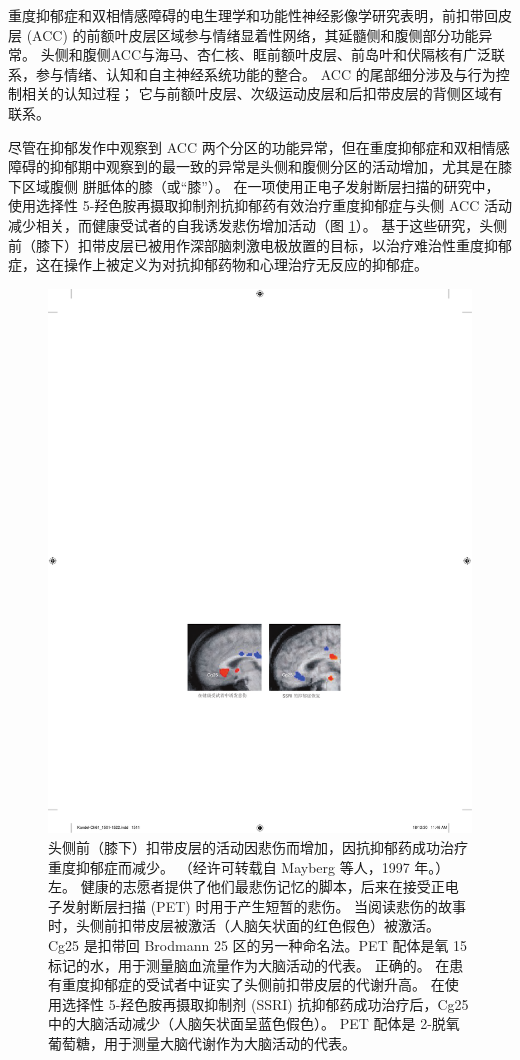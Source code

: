 重度抑郁症和双相情感障碍的电生理学和功能性神经影像学研究表明，前扣带回皮层 (ACC) 的前额叶皮层区域参与情绪显着性网络，其延髓侧和腹侧部分功能异常。 头侧和腹侧ACC与海马、杏仁核、眶前额叶皮层、前岛叶和伏隔核有广泛联系，参与情绪、认知和自主神经系统功能的整合。
ACC 的尾部细分涉及与行为控制相关的认知过程；
它与前额叶皮层、次级运动皮层和后扣带皮层的背侧区域有联系。


尽管在抑郁发作中观察到 ACC 两个分区的功能异常，但在重度抑郁症和双相情感障碍的抑郁期中观察到的最一致的异常是头侧和腹侧分区的活动增加，尤其是在膝下区域腹侧 胼胝体的膝（或“膝”）。
在一项使用正电子发射断层扫描的研究中，使用选择性 5-羟色胺再摄取抑制剂抗抑郁药有效治疗重度抑郁症与头侧 ACC 活动减少相关，而健康受试者的自我诱发悲伤增加活动（图 \ref{fig:61_4}）。
基于这些研究，头侧前（膝下）扣带皮层已被用作深部脑刺激电极放置的目标，以治疗难治性重度抑郁症，这在操作上被定义为对抗抑郁药物和心理治疗无反应的抑郁症。


\begin{figure}[htbp]
	\centering
	\includegraphics[width=0.6\linewidth]{chap61/fig_61_4}
	\caption{头侧前（膝下）扣带皮层的活动因悲伤而增加，因抗抑郁药成功治疗重度抑郁症而减少。 （经许可转载自 Mayberg 等人，1997 年。）左。 健康的志愿者提供了他们最悲伤记忆的脚本，后来在接受正电子发射断层扫描 (PET) 时用于产生短暂的悲伤。 当阅读悲伤的故事时，头侧前扣带皮层被激活（人脑矢状面的红色假色）被激活。 Cg25 是扣带回 Brodmann 25 区的另一种命名法。PET 配体是氧 15 标记的水，用于测量脑血流量作为大脑活动的代表。 正确的。 在患有重度抑郁症的受试者中证实了头侧前扣带皮层的代谢升高。 在使用选择性 5-羟色胺再摄取抑制剂 (SSRI) 抗抑郁药成功治疗后，Cg25 中的大脑活动减少（人脑矢状面呈蓝色假色）。 PET 配体是 2-脱氧葡萄糖，用于测量大脑代谢作为大脑活动的代表。}
	\label{fig:61_4}
\end{figure}


